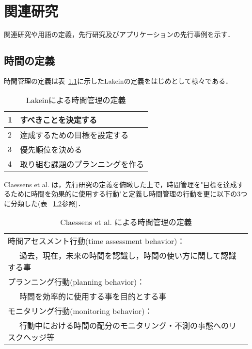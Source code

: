 \chapter{関連研究}
関連研究や用語の定義，先行研究及びアプリケーションの先行事例を示す．

\section{時間の定義}
時間管理の定義は表~\ref{tb:Lakein}に示したLakeinの定義\cite{Lakein1989}をはじめとして様々である．

\begin{table}[htb]
\begin{center}
  \begin{tabular}{|l|l|} \hline
   1 & すべきことを決定する \\ \hline
   2 & 達成するための目標を設定する \\ \hline
   3 & 優先順位を決める \\ \hline
   4 & 取り組む課題のプランニングを作る \\ \hline
  \end{tabular}
  \caption{Lakeinによる時間管理の定義}
  \label{tb:Lakein}
\end{center}
\end{table}

Claessens et al. は，先行研究の定義を俯瞰した上で，時間管理を"目標を達成するために時間を効果的に使用する行動"と定義し時間管理の行動を更に以下の3つに分類した\cite{Claessens2007}(表 ~\ref{tb:Claessens}参照)．

\begin{table}[htb]
\begin{center}
  \begin{tabular}{|l|l|} \hline
   時間アセスメント行動(time assessment behavior)： \\ ~~~過去，現在，未来の時間を認識し，時間の使い方に関して認識する事 \\ \hline
   プランニング行動(planning behavior)：　\\  ~~~時間を効率的に使用する事を目的とする事 \\ \hline
   モニタリング行動(monitoring behavior)： \\ ~~~行動中における時間の配分のモニタリング・不測の事態へのリスクヘッジ等 \\ \hline
  \end{tabular}
  \caption{Claessens et al. による時間管理の定義}
  \label{tb:Claessens}
\end{center}
\end{table}

